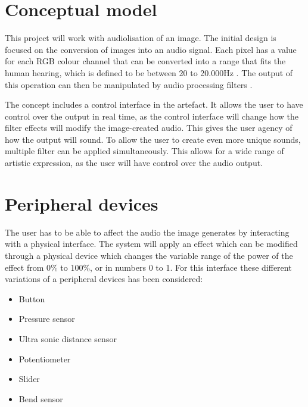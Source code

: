 \section{Conceptual model}

This project will work with audiolisation of an image. The initial design is focused on the conversion of images into an audio signal. Each pixel has a value for each RGB colour channel that can be converted into a range that fits the human hearing, which is defined to be between 20 to 20.000Hz \cite{Dsp1997}. The output of this operation can then be manipulated by audio processing filters .

The concept includes a control interface in the artefact. It allows the user to have control over the output in real time, as the control interface will change how the filter effects will modify the image-created audio. This gives the user agency of how the output will sound. To allow the user to create even more unique sounds, multiple filter can be applied simultaneously. This allows for a wide range of artistic expression, as the user will have control over the audio output.


\section{Peripheral devices}
The user has to be able to affect the audio the image generates by interacting with a physical interface. The system will apply an effect which can be modified through a physical device which changes the variable range of the power of the effect from 0\% to 100\%, or in numbers 0 to 1. For this interface these different variations of a peripheral devices has been considered: 

\begin{itemize}
\item Button
\item Pressure sensor
\item Ultra sonic distance sensor
\item Potentiometer
\item Slider
\item Bend sensor
\end{itemize}

